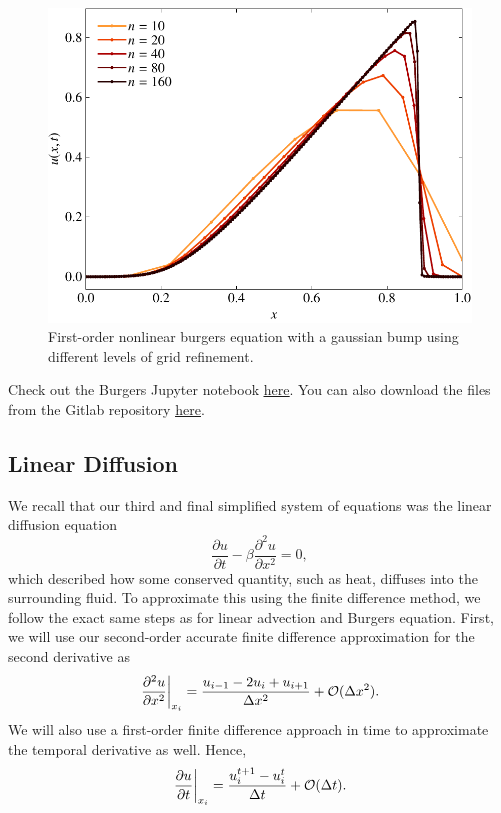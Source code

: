 \begin{figure}[htbp]
	\centering
	\includegraphics[width=0.65\linewidth]{Pictures/burgers_upwind}
	\caption{First-order nonlinear burgers equation with a gaussian bump using different levels of grid refinement.}
	\label{fig:burgers_upwind}
\end{figure}
\begin{jupyternote}
	Check out the Burgers Jupyter notebook \href{\binderurl}{\underline{here}}. You can also download the files from the Gitlab repository \href{\repourl}{\underline{here}}.
\end{jupyternote}

\subsection{Linear Diffusion}
We recall that our third and final simplified system of equations was the linear diffusion equation
\begin{equation}
\frac{\partial u}{\partial t} - \beta \frac{\partial^2 u}{\partial x^2} = 0,
\end{equation}
which described how some conserved quantity, such as heat, diffuses into the surrounding fluid. To approximate this using the finite difference method, we follow the exact same steps as for linear advection and Burgers equation. First, we will use our second-order accurate finite difference approximation for the second derivative as
\begin{equation}
	\left.\frac{\partial^2 u}{\partial x^2}\right\rvert_{x_i}^{} = \frac{u_{i-1} - 2u_i + u_{i+1}}{\Delta x^2} + \mathcal{O}(\Delta x^2).
\end{equation}
We will also use a first-order finite difference approach in time to approximate the temporal derivative as well. Hence,
\begin{equation}
	\left.\frac{\partial u}{\partial t}\right\rvert_{x_i}^{} = \frac{u_i^{t+1} - u_{i}^t}{\Delta t} + \mathcal{O}(\Delta t).
\end{equation}

